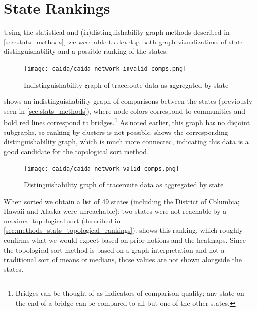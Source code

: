 \section{State Rankings}

Using the statistical and (in)distinguishability graph methods described in \cref{sec:stats_methods}, we were able to develop both graph visualizations of state distinguishability and a possible ranking of the states.

\begin{figure}[h]
    \centering
    \texttt{[image: caida/caida\_network\_invalid\_comps.png]}
    \caption{Indistinguishability graph of traceroute data as aggregated by state}
    \label{fig:caida_network_invalid_comps}
\end{figure}

 shows an indistinguishability graph of comparisons between the states (previously seen in \cref{sec:stats_methods}), where node colors correspond to communities and bold red lines correspond to bridges.\footnote{Bridges can be thought of as indicators of comparison quality; any state on the end of a bridge can be compared to all but one of the other states.} As noted earlier, this graph has no disjoint subgraphs, so ranking by clusters is not possible.  shows the corresponding distinguishability graph, which is much more connected, indicating this data is a good candidate for the topological sort method.

\begin{figure}[h]
    \centering
    \texttt{[image: caida/caida\_network\_valid\_comps.png]}
    \caption{Distinguishability graph of traceroute data as aggregated by state}
    \label{fig:caida_network_valid_comps}
\end{figure}

When sorted we obtain a list of 49 states (including the District of Columbia; Hawaii and Alaska were unreachable); two states were not reachable by a maximal topological sort (described in \cref{sec:methods_stats_topological_rankings}).  shows this ranking, which roughly confirms what we would expect based on prior notions and the heatmaps. Since the topological sort method is based on a graph interpretation and not a traditional sort of means or medians, those values are not shown alongside the states.



